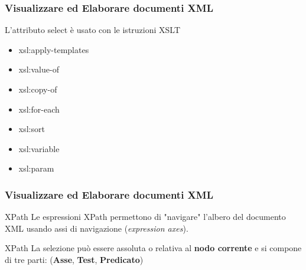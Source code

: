 \begin{frame}
    \frametitle{Visualizzare ed Elaborare documenti XML}
    \addtocounter{nframe}{1}
    

    \begin{block}{L’attributo select è usato con le istruzioni XSLT}
        \begin{itemize}
            \item xsl:apply-templates
            \item xsl:value-of
            \item xsl:copy-of
            \item xsl:for-each
            \item xsl:sort
            \item xsl:variable
            \item xsl:param
        \end{itemize}
    \end{block}

\end{frame}

\begin{frame}
    \frametitle{Visualizzare ed Elaborare documenti XML}
    \addtocounter{nframe}{1}
    

    \begin{block}{XPath}
        Le espressioni XPath permettono di "navigare" l'albero del documento XML usando assi di navigazione (\textit{expression axes}).
    \end{block}

    \begin{block}{XPath}
        La selezione può essere assoluta o relativa al \textbf{nodo corrente} e si compone di tre parti: (\textbf{Asse}, \textbf{Test}, \textbf{Predicato})
    \end{block}
    
\end{frame}

